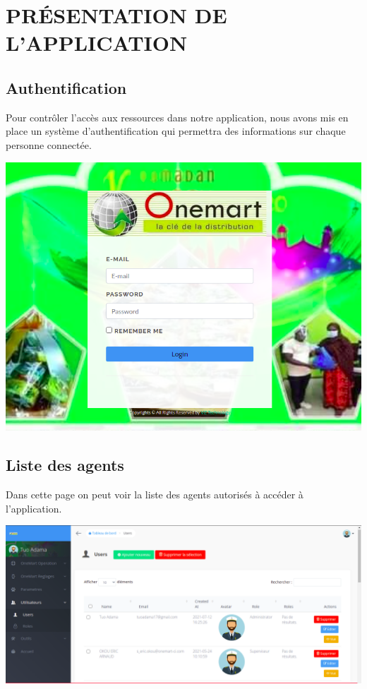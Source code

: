 \chapter{PRÉSENTATION DE L'APPLICATION}
	\section{Authentification}
		Pour contrôler l'accès aux ressources dans notre application, nous avons mis en place un système d'authentification qui permettra des informations sur chaque personne connectée.
		\begin{center}
			\includegraphics[scale=0.6]{chap_3/authentification.png}
			\label{page_authentification}
		\end{center}
	\section{Liste des agents}
		Dans cette page on peut voir la liste des agents autorisés à accéder à l'application.
		\begin{center}
			\includegraphics[scale=0.4]{chap_3/utilisateurs.png}
			\label{liste_des_agents}
		\end{center}
